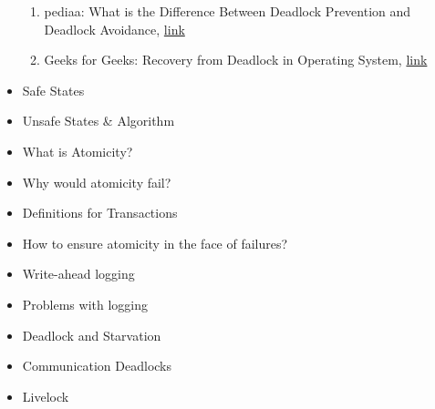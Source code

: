 \documentclass[12pt]{article}
\begin{document}
\begin{itemize}
    \begin{enumerate}[1)]
        \item pediaa: What is the Difference Between Deadlock Prevention and Deadlock Avoidance, \href{https://pediaa.com/what-is-the-difference-between-deadlock-prevention-and-deadlock-avoidance/}{link}
        \item Geeks for Geeks: Recovery from Deadlock in Operating System, \href{https://www.geeksforgeeks.org/recovery-from-deadlock-in-operating-system/?ref=rp}{link}
    \end{enumerate}
    \item Safe States
    \item Unsafe States \& Algorithm
    \item What is Atomicity?
    \item Why would atomicity fail?
    \item Definitions for Transactions
    \item How to ensure atomicity in the face of failures?
    \item Write-ahead logging
    \item Problems with logging
    \item Deadlock and Starvation
    \item Communication Deadlocks
    \item Livelock
\end{itemize}
\end{document}
